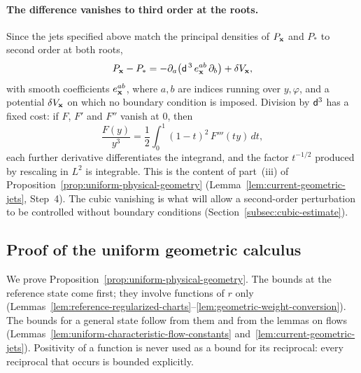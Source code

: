 \paragraph{The difference vanishes to third order at the roots.}
Since the jets specified above match the principal densities of
$P_{\mathbf x}$ and $P_*$ to second order at both roots,
\begin{equation}\label{eq:readable-positive-difference}
 P_{\mathbf x}-P_*=-\partial_a\bigl(\mathsf d^{\,3}\,e_{\mathbf x}^{ab}\,\partial_b\bigr)
                           +\delta V_{\mathbf x} ,
\end{equation}
with smooth coefficients $e^{ab}_{\mathbf x}$, where $a,b$ are indices
running over $y,\varphi$, and a potential $\delta V_{\mathbf x}$ on which no
boundary condition is imposed. Division by $\mathsf d^3$ has a fixed cost:
if $F$, $F'$ and $F''$ vanish at $0$, then
\[
 \frac{F(y)}{y^3}=\frac12\int_0^1(1-t)^2\,F'''(ty)\,dt ,
\]
each further derivative differentiates the integrand, and the factor
$t^{-1/2}$ produced by rescaling in $L^2$ is integrable. This is the
content of part~(iii) of
Proposition~\ref{prop:uniform-physical-geometry}
(Lemma~\ref{lem:current-geometric-jets}, Step~4). The
cubic vanishing is what will allow a second-order perturbation to be
controlled without boundary conditions
(Section~\ref{subsec:cubic-estimate}).

\subsection{Proof of the uniform geometric calculus}
\label{subsec:geometry-proofs}

We prove Proposition~\ref{prop:uniform-physical-geometry}. The bounds
at the reference state come first; they involve functions of $r$ only
(Lemmas~\ref{lem:reference-regularized-charts}--\ref{lem:geometric-weight-conversion}).
The bounds for a general state follow from them and from the lemmas
on flows
(Lemmas~\ref{lem:uniform-characteristic-flow-constants}
and~\ref{lem:current-geometric-jets}). Positivity of a function is
never used as a bound for its reciprocal: every reciprocal that
occurs is bounded explicitly.

